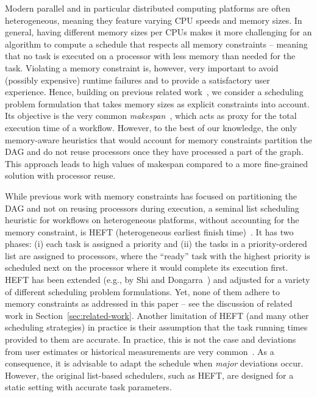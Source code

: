 \documentclass[conference]{IEEEtran}
\newcommand{\skug}[1]{{\color{blue}[SK: #1]}}
\newcommand{\hmey}[1]{{\color{red}[HM: #1]}}
\newcommand{\AB}[1]{{\color{purple}[AB: #1]}}
\begin{document}
Modern parallel and in particular distributed computing platforms are often heterogeneous,
meaning they feature varying CPU speeds and memory sizes. 
In general, having different memory sizes per CPUs makes it more challenging for an algorithm 
to compute a schedule that respects all memory constraints -- meaning that no task is executed on a 
processor with less memory than needed for the task. Violating a memory constraint is, however, 
very important to avoid (possibly expensive) runtime failures and to provide a satisfactory user experience.
Hence, building on previous related %
work~\cite{gou2020partitioning,He21,DBLP:conf/icpp/KulaginaMB24}, we consider a scheduling problem 
formulation that takes memory sizes as explicit constraints into account. 
Its objective is the very common \emph{makespan}~\cite{liu2018survey}, 
which acts as proxy for the total execution time of a workflow.
However, to the best of our knowledge, the only memory-aware heuristics that would account for 
memory constraints partition the DAG and do not reuse processors once they have processed a part
of the graph. This approach leads to high values of makespan compared to a more fine-grained solution
with processor reuse. 

While previous work with memory constraints has focused on partitioning the DAG and not on 
reusing processors during execution, a seminal list scheduling heuristic for workflows on 
heterogeneous platforms, without accounting for the memory constraint, is HEFT 
(heterogeneous earliest finish time)~\cite{topcuoglu2002performance}.
It has two phases: (i) each task is assigned a priority and (ii) the tasks in a priority-ordered list are assigned
to processors, where the ``ready'' task with the highest priority is scheduled next on the processor
where it would complete its execution first. 
HEFT has been extended (e.g., by Shi and Dongarra~\cite{SHI2006665}) and adjusted 
for a variety of different scheduling problem formulations. 
Yet, none of them adhere to memory constraints as addressed in this paper -- 
see the discussion of related work in Section~\ref{sec:related-work}. 
%    
Another limitation of HEFT (and many other scheduling strategies) in practice is their 
assumption that the task running times provided to them are accurate. In practice, this is 
not the case and deviations from user estimates or historical measurements are 
very common~\cite{hirales2012multiple}. As a consequence, it is advisable to adapt the schedule when \emph{major}
deviations occur. However, the original list-based schedulers, such as HEFT, are designed
for a static setting with accurate task parameters. 
%    
\end{document}
